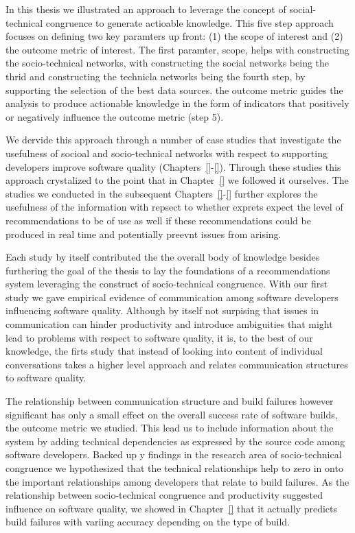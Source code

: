 In this thesis we illustrated an approach to leverage the concept of social-technical congruence to generate actioable knowledge.
This five step approach focuses on defining two key paramters up front: (1) the scope of interest and (2) the outcome metric of interest.
The first paramter, scope, helps with constructing the socio-technical networks, with constructing the social networks being the thrid and constructing the technicla networks being the fourth step, by supporting the selection of the best data sources.
the outcome metric guides the analysis to produce actionable knowledge in the form of indicators that positively or negatively influence the outcome metric (step 5). 

We dervide this approach through a number of case studies that investigate the usefulness of socioal and socio-technical networks with respect to supporting developers improve software quality (Chapters~\ref{}-\ref{}).
Through these studies this approach crystalized to the point that in Chapter~\ref{} we followed it ourselves.
The studies we conducted in the subsequent Chapters~\ref{}-\ref{} further explores the usefulness of the information with repsect to whether exprets expect the level of recommendations to be of use as well if these recommendations could be produced in real time and potentially preevnt issues from arising.

Each study by itself contributed the the overall body of knowledge besides furthering the goal of the thesis to lay the foundations of a recommendations system leveraging the construct of socio-technical congruence.
With our first study we gave empirical evidence of communication among software developers influencing software quality.
Although by itself not surpising that issues in communication can hinder productivity and introduce ambiguities that might lead to problems with respect to software quality, it is, to the best of our knowledge, the firts study that instead of looking into content of individual  conversations takes a higher level approach and relates communication structures to software quality.

The relationship between communication structure and build failures however significant has only a small effect on the overall success rate of software builds, the outcome metric we studied.
This lead us to include information about the system by adding technical dependencies as expressed by the source code among software developers.
Backed up y findings in the research area of socio-technical congruence we hypothesized that the technical relationships help to zero in onto the important relationships among developers that relate to build failures.
As the relationship between socio-technical congruence and productivity suggested influence on software quality, we showed in Chapter~\ref{} that it actually predicts build failures with variing accuracy depending on the type of build.

